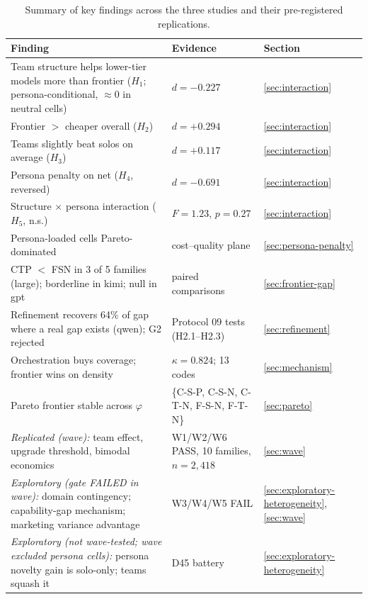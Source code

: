 \documentclass[12pt,a4paper]{article}
\newcommand{\phiBlend}{\varphi}
\begin{document}
\begin{table}[ht]
  \centering
  \footnotesize
  \caption{Summary of key findings across the three studies and their
  pre-registered replications.}
  \label{tab:summary-findings}
  \begin{tabular}{@{}>{\raggedright\arraybackslash}p{7.6cm} >{\raggedright\arraybackslash}p{4.6cm} >{\raggedright\arraybackslash}p{2.2cm}@{}}
    \toprule
    \textbf{Finding} & \textbf{Evidence} & \textbf{Section} \\
    \midrule
    Team structure helps lower-tier models more than frontier ($H_1$; persona-conditional, $\approx 0$ in neutral cells) & $d = -0.227$ & \cref{sec:interaction} \\
    Frontier $>$ cheaper overall ($H_2$) & $d = +0.294$ & \cref{sec:interaction} \\
    Teams slightly beat solos on average ($H_3$) & $d = +0.117$ & \cref{sec:interaction} \\
    Persona penalty on net ($H_4$, reversed) & $d = -0.691$ & \cref{sec:interaction} \\
    Structure $\times$ persona interaction ($H_5$, n.s.) & $F = 1.23$, $p = 0.27$ & \cref{sec:interaction} \\
    Persona-loaded cells Pareto-dominated & cost--quality plane & \cref{sec:persona-penalty} \\
    CTP $<$ FSN in 3 of 5 families (large); borderline in kimi; null in gpt & paired comparisons & \cref{sec:frontier-gap} \\
    Refinement recovers 64\% of gap where a real gap exists (qwen); G2 rejected & Protocol 09 tests (H2.1--H2.3) & \cref{sec:refinement} \\
    Orchestration buys coverage; frontier wins on density & $\kappa = 0.824$; 13 codes & \cref{sec:mechanism} \\
    Pareto frontier stable across $\phiBlend$ & \{C-S-P, C-S-N, C-T-N, F-S-N, F-T-N\} & \cref{sec:pareto} \\
    \emph{Replicated (wave):} team effect, upgrade threshold, bimodal economics & W1/W2/W6 PASS, 10 families, $n = 2{,}418$ & \cref{sec:wave} \\
    \emph{Exploratory (gate FAILED in wave):} domain contingency; capability-gap mechanism; marketing variance advantage & W3/W4/W5 FAIL & \cref{sec:exploratory-heterogeneity}, \cref{sec:wave} \\
    \emph{Exploratory (not wave-tested; wave excluded persona cells):} persona novelty gain is solo-only; teams squash it & D45 battery & \cref{sec:exploratory-heterogeneity} \\

\end{tabular}
\end{table}
\end{document}
